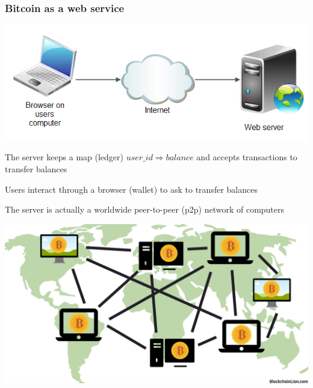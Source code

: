 \documentclass[11pt]{beamer}  %
\begin{document}
\begin{frame}\frametitle{Bitcoin as a web service}

  \begin{center}
    \includegraphics[scale=.3,clip=false]{pictures/web-server.png}
  \end{center}

  \medskip

  The server keeps a map (\alert{ledger}) $\mathit{user\_id}\Rightarrow\mathit{balance}$
  and accepts transactions to transfer balances

  \medskip

  Users interact through a browser (\alert{wallet}) to ask to transfer balances

  \medskip
  The server is actually a worldwide peer-to-peer (p2p) network of computers

  \begin{center}
    \includegraphics[scale=.13,clip=false]{pictures/distributed.png}
  \end{center}

\end{frame}
\end{document}
